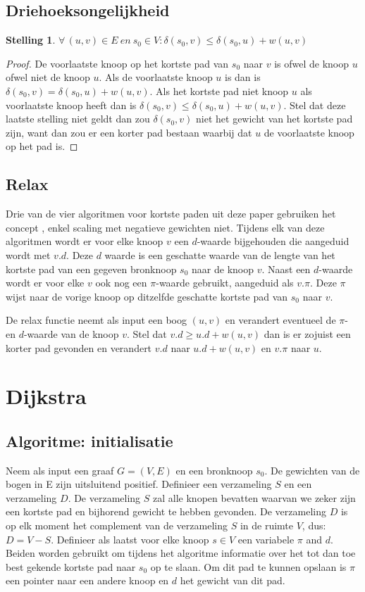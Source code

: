 \documentclass[conference]{IEEEtran}
\newtheorem{theorem}{Stelling}[section]
\theoremstyle{definition}
\let \oldforall \forall
\renewcommand{\forall}{\oldforall\,}
\begin{document}
\subsection{Driehoeksongelijkheid} \label{concepts:driehoeksongelijkheid}
\begin{theorem}
    $\forall (u, v) \in E\ en\ s_0 \in V: \delta(s_0, v) \leq \delta(s_0, u) + w(u, v)$
\end{theorem}
\begin{proof}
    De voorlaatste knoop op het kortste pad van $s_0$ naar $v$ is ofwel de knoop $u$ ofwel niet de knoop $u$. Als de voorlaatste knoop $u$ is dan is $\delta(s_0, v) = \delta(s_0, u) + w(u, v)$. Als het kortste pad niet knoop $u$ als voorlaatste knoop heeft dan is $\delta(s_0, v) \leq \delta(s_0, u) + w(u, v)$. Stel dat deze laatste stelling niet geldt dan zou $\delta(s_0, v)$ niet het gewicht van het kortste pad zijn, want dan zou er een korter pad bestaan waarbij dat $u$ de voorlaatste knoop op het pad is.
\end{proof}

\subsection{Relax} \label{concepts:relax}
Drie van de vier algoritmen voor kortste paden uit deze paper gebruiken het concept , enkel scaling met negatieve gewichten niet. Tijdens elk van deze algoritmen wordt er voor elke knoop $v$ een $d$-waarde bijgehouden die aangeduid wordt met $v.d$. Deze $d$ waarde is een geschatte waarde van de lengte van het kortste pad van een gegeven bronknoop $s_0$ naar de knoop $v$. Naast een $d$-waarde wordt er voor elke $v$ ook nog een $\pi$-waarde gebruikt, aangeduid als $v.\pi$. Deze $\pi$ wijst naar de vorige knoop op ditzelfde geschatte kortste pad van $s_0$ naar $v$.

De relax functie neemt als input een boog $(u, v)$ en verandert eventueel de $\pi$- en $d$-waarde van de knoop $v$. Stel dat $v.d \geq u.d + w(u, v)$ dan is er zojuist een korter pad gevonden en verandert $v.d$ naar $u.d + w(u, v)$ en $v.\pi$ naar $u$.

\section{Dijkstra}
\subsection{Algoritme: initialisatie}
Neem als input een graaf $G = (V, E)$ en een bronknoop $s_0$. De gewichten van de bogen in E zijn uitsluitend positief. Definieer een verzameling $S$ en een verzameling $D$. De verzameling $S$ zal alle knopen bevatten waarvan we zeker zijn een kortste pad en bijhorend gewicht te hebben gevonden. De verzameling $D$ is op elk moment het complement van de verzameling $S$ in de ruimte $V$, dus: $D = V - S$. Definieer als laatst voor elke knoop $s \in V$ een variabele $\pi$ and $d$. Beiden worden gebruikt om tijdens het algoritme informatie over het tot dan toe best gekende kortste pad naar $s_0$ op te slaan. Om dit pad te kunnen opslaan is $\pi$ een pointer naar een andere knoop en $d$ het gewicht van dit pad.
\end{document}
